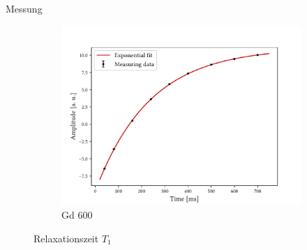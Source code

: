 \begin{frame}{Messung}
\begin{figure}
\begin{subfigure}{.49\textwidth}
		\includegraphics[scale=.36]{..//figures//f61_abb_1_600.pdf}
		\caption{Gd 600}
		\end{subfigure}
	\caption{Relaxationszeit $T_1$}
	\end{figure}
\end{frame}

